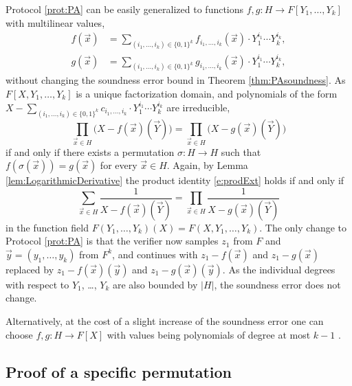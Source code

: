 \documentclass[11pt]{article}
\theoremstyle{definition}
\theoremstyle{remark}
\begin{document}
Protocol \ref{prot:PA} can be easily generalized to functions $f,g: H\longrightarrow F[Y_1,\ldots,Y_k]$ with multilinear values, 
\begin{align*}
f(\vec x) &= \sum_{(i_1,\ldots, i_k)\in\{0,1\}^k} f_{i_1,\ldots, i_k}(\vec x)\cdot Y_1^{i_1}\cdots Y_k^{i_k},
\\
g(\vec x) &= \sum_{(i_1,\ldots, i_k)\in\{0,1\}^k} g_{i_1,\ldots, i_k}(\vec x)\cdot Y_1^{i_1}\cdots Y_k^{i_k},
\end{align*}
without changing the soundness error bound in Theorem \ref{thm:PAsoundness}.
As $F[X,Y_1,\ldots, Y_k]$ is a unique factorization domain, and polynomials of the form $X -  \sum_{(i_1,\ldots, i_k)\in\{0,1\}^k} c_{i_1,\ldots, i_k}\cdot Y_1^{i_1}\cdots Y_k^{i_k}$ are irreducible,
\begin{equation}
\label{e:prodExt}
\prod_{\vec x\in H} \Big(X -  f(\vec x)(\vec Y)\big) = \prod_{\vec x\in H} \big(X - g(\vec x)(\vec Y)\big)
\end{equation}
if and only if there exists a permutation $\sigma:H\rightarrow H$ such that $f(\sigma(\vec x)) = g(\vec x)$ for every $\vec x\in H$.
Again, by Lemma \ref{lem:LogarithmicDerivative} the product identity \eqref{e:prodExt} holds if and only if 
\begin{equation}
\label{e:sumExt}
\sum_{\vec x\in H} \frac{1}{X -  f(\vec x)(\vec Y)} = \prod_{\vec x\in H} \frac{1}{X - g(\vec x)(\vec Y)}
\end{equation}
in the function field $F(Y_1,\ldots, Y_k)(X) = F(X,Y_1,\ldots, Y_k)$.
The only change to Protocol \ref{prot:PA} is that the verifier now samples $z_1$ from $F$ and $\vec y = (y_1,\ldots, y_k)$ from $F^k$, and continues with $z_1 - f(\vec x)$ and $z_1 - g(\vec x)$ replaced by $z_1 - f(\vec x)(\vec y)$ and $z_1 - g(\vec x)(\vec y)$.
As the individual degrees with respect to $Y_1$, \ldots, $Y_k$ are also bounded by $|H|$, the soundness error does not change.

Alternatively, at the cost of a slight increase of the soundness error one can choose $f, g: H\longrightarrow F[X]$ with values being polynomials of degree at most $k-1$ . 

\subsection{Proof of a specific permutation}
\end{document}
